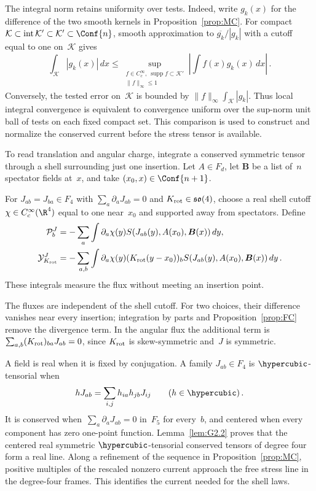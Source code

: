 The integral norm retains uniformity over tests. Indeed, write $g_k(x)$ for the difference of the two smooth kernels in Proposition~\ref{prop:MC}. For compact $\mathcal K\subset\operatorname{int}\mathcal K'\subset\mathcal K'\subset\Conf{n}$, smooth approximation to $\overline{g_k}/|g_k|$ with a cutoff equal to one on~$\mathcal K$ gives
\begin{equation*}
\int_{\mathcal K}|g_k(x)|\,dx
\le\sup_{\substack{f\in C_c^\infty,\ \operatorname{supp}f\subset\mathcal K'\\\|f\|_\infty\le1}}
\left|\int f(x)g_k(x)\,dx\right|\,.
\end{equation*}
Conversely, the tested error on~$\mathcal K$ is bounded by $\|f\|_\infty\int_{\mathcal K}|g_k|$. Thus local integral convergence is equivalent to convergence uniform over the sup-norm unit ball of tests on each fixed compact set. This comparison is used to construct and normalize the conserved current before the stress tensor is available.

To read translation and angular charge, integrate a conserved symmetric tensor through a shell surrounding just one insertion. Let $A\in F_d$, let $\boldsymbol B$ be a list of~$n$ spectator fields at~$x$, and take $(x_0,x)\in\Conf{n+1}$.
\begin{definition}\label{def:D13}
For $J_{ab}=J_{ba}\in F_4$ with $\sum_a\partial_aJ_{ab}=0$ and $K_{\rm rot}\in\mathfrak{so}(4)$, choose a real shell cutoff $\chi\in C_c^\infty(\R^4)$ equal to one near~$x_0$ and supported away from spectators. Define
\begin{align*}
\mathcal P_b^J&=-\sum_a\int\partial_a\chi(y)
S(J_{ab}(y),A(x_0),\boldsymbol B(x))\,dy,\\
\mathcal Y_{K_{\rm rot}}^J&=-\sum_{a,b}\int\partial_a\chi(y)(K_{\rm rot}(y-x_0))_b
S(J_{ab}(y),A(x_0),\boldsymbol B(x))\,dy\,.
\end{align*}
These integrals measure the flux without meeting an insertion point.
\end{definition}
The fluxes are independent of the shell cutoff. For two choices, their difference vanishes near every insertion; integration by parts and Proposition~\ref{prop:FC} remove the divergence term. In the angular flux the additional term is $\sum_{a,b}(K_{\rm rot})_{ba}J_{ab}=0$, since $K_{\rm rot}$ is skew-symmetric and~$J$ is symmetric.

A field is real when it is fixed by conjugation. A family $J_{ab}\in F_4$ is $\hypercubic$-tensorial when
\begin{equation*}
hJ_{ab}=\sum_{i,j}h_{ia}h_{jb}J_{ij}\qquad(h\in\hypercubic)\,.
\end{equation*}
It is conserved when~$\sum_a\partial_aJ_{ab}=0$ in~$F_5$ for every~$b$, and centered when every component has zero one-point function. Lemma~\ref{lem:G2.2} proves that the centered real symmetric $\hypercubic$-tensorial conserved tensors of degree four form a real line. Along a refinement of the sequence in Proposition~\ref{prop:MC}, positive multiples of the rescaled nonzero current approach the free stress line in the degree-four frames. This identifies the current needed for the shell laws.

